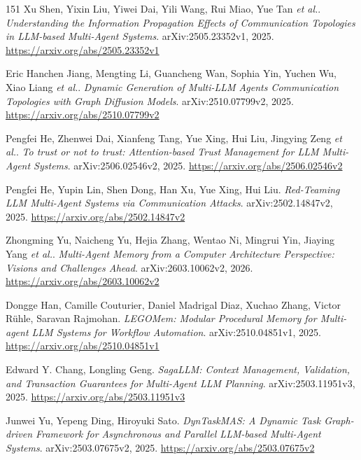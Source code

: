 \documentclass[11pt,a4paper]{article}
\begin{document}
\begin{thebibliography}{151}
Xu Shen, Yixin Liu, Yiwei Dai, Yili Wang, Rui Miao, Yue Tan \emph{et al.}.
\newblock \emph{Understanding the Information Propagation Effects of Communication Topologies in LLM-based Multi-Agent Systems}.
\newblock arXiv:2505.23352v1, 2025.
\newblock \url{https://arxiv.org/abs/2505.23352v1}

Eric Hanchen Jiang, Mengting Li, Guancheng Wan, Sophia Yin, Yuchen Wu, Xiao Liang \emph{et al.}.
\newblock \emph{Dynamic Generation of Multi-LLM Agents Communication Topologies with Graph Diffusion Models}.
\newblock arXiv:2510.07799v2, 2025.
\newblock \url{https://arxiv.org/abs/2510.07799v2}

Pengfei He, Zhenwei Dai, Xianfeng Tang, Yue Xing, Hui Liu, Jingying Zeng \emph{et al.}.
\newblock \emph{To trust or not to trust: Attention-based Trust Management for LLM Multi-Agent Systems}.
\newblock arXiv:2506.02546v2, 2025.
\newblock \url{https://arxiv.org/abs/2506.02546v2}

Pengfei He, Yupin Lin, Shen Dong, Han Xu, Yue Xing, Hui Liu.
\newblock \emph{Red-Teaming LLM Multi-Agent Systems via Communication Attacks}.
\newblock arXiv:2502.14847v2, 2025.
\newblock \url{https://arxiv.org/abs/2502.14847v2}

Zhongming Yu, Naicheng Yu, Hejia Zhang, Wentao Ni, Mingrui Yin, Jiaying Yang \emph{et al.}.
\newblock \emph{Multi-Agent Memory from a Computer Architecture Perspective: Visions and Challenges Ahead}.
\newblock arXiv:2603.10062v2, 2026.
\newblock \url{https://arxiv.org/abs/2603.10062v2}

Dongge Han, Camille Couturier, Daniel Madrigal Diaz, Xuchao Zhang, Victor R\"{u}hle, Saravan Rajmohan.
\newblock \emph{LEGOMem: Modular Procedural Memory for Multi-agent LLM Systems for Workflow Automation}.
\newblock arXiv:2510.04851v1, 2025.
\newblock \url{https://arxiv.org/abs/2510.04851v1}

Edward Y. Chang, Longling Geng.
\newblock \emph{SagaLLM: Context Management, Validation, and Transaction Guarantees for Multi-Agent LLM Planning}.
\newblock arXiv:2503.11951v3, 2025.
\newblock \url{https://arxiv.org/abs/2503.11951v3}

Junwei Yu, Yepeng Ding, Hiroyuki Sato.
\newblock \emph{DynTaskMAS: A Dynamic Task Graph-driven Framework for Asynchronous and Parallel LLM-based Multi-Agent Systems}.
\newblock arXiv:2503.07675v2, 2025.
\newblock \url{https://arxiv.org/abs/2503.07675v2}


\end{thebibliography}
\end{document}
